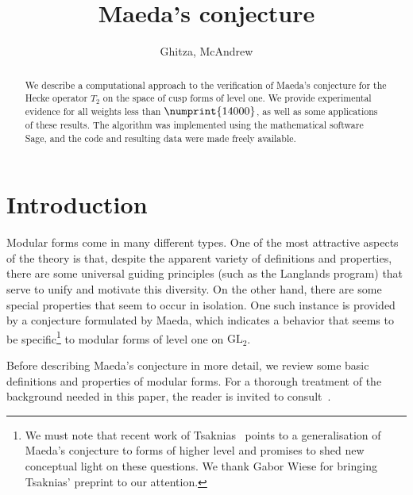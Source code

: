 \documentclass{book}
\title{Maeda's conjecture}{Experimental evidence for Maeda's conjecture on
modular forms}
\author{Ghitza, McAndrew}{
  Alexandru Ghitza\addr{1}
\and 
Angus McAndrew\addr{1}}
\newcommand{\bound}{\numprint{14000}}
\newcommand{\GL}{\mathrm{GL}}
\begin{document}
\maketitle

\begin{abstract}
  We describe a computational approach to the verification of Maeda's conjecture
  for the Hecke operator $T_2$ on the space of cusp forms of level one. We provide
  experimental evidence for all weights less than $\bound$, as well as some
  applications of these results.  The algorithm was implemented using the
  mathematical software Sage, and the code and resulting data were made
  freely available.
\end{abstract}


\section{Introduction}
\label{sect:introduction}
Modular forms come in many different types.  One of the most attractive
aspects of the theory is that, despite the apparent variety of definitions
and properties, there are some universal guiding principles (such as the
Langlands program) that serve to unify and motivate this diversity.  On the
other hand, there are some special properties that seem to occur in isolation.
One such instance is provided by a conjecture formulated by Maeda, which
indicates a behavior that seems to be specific\footnote{We must note that
  recent work of Tsaknias~\cite{Tsaknias} points to a generalisation of
Maeda's conjecture to forms of higher level and promises to shed new
conceptual light on these questions.  We thank Gabor Wiese for
bringing Tsaknias' preprint to our attention.} to modular forms of level one
on $\GL_2$.  

Before describing Maeda's conjecture in more detail, we review some basic 
definitions and properties of modular forms.  For a thorough treatment of
the background needed in this paper, the reader is invited to
consult~\cite{Stein}.
\end{document}
